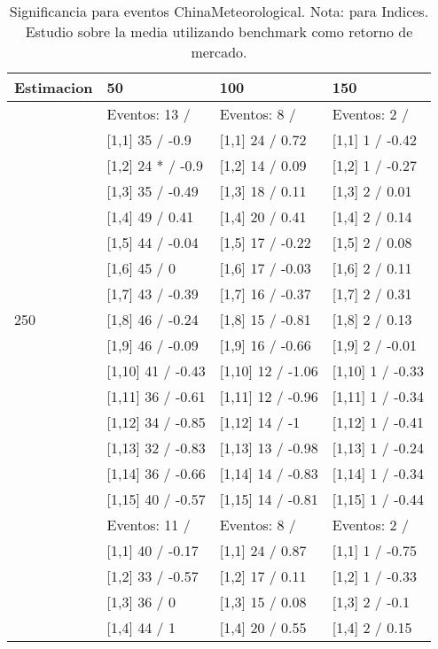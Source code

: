 \begin{table}

\caption{Significancia para eventos ChinaMeteorological. Nota: para Indices. Estudio sobre la media utilizando benchmark como retorno de mercado.}
\centering
\begin{tabular}[t]{llll}
\toprule
Estimacion & 50 & 100 & 150\\
\midrule
 & Eventos:  13 / & Eventos:  8 / & Eventos:  2 /\\
 & {}[1,1] 35  / -0.9 & {}[1,1] 24  / 0.72 & {}[1,1] 1  / -0.42\\
 & {}[1,2] 24 * / -0.9 & {}[1,2] 14  / 0.09 & {}[1,2] 1  / -0.27\\
 & {}[1,3] 35  / -0.49 & {}[1,3] 18  / 0.11 & {}[1,3] 2  / 0.01\\
 & {}[1,4] 49  / 0.41 & {}[1,4] 20  / 0.41 & {}[1,4] 2  / 0.14\\
\addlinespace
 & {}[1,5] 44  / -0.04 & {}[1,5] 17  / -0.22 & {}[1,5] 2  / 0.08\\
 & {}[1,6] 45  / 0 & {}[1,6] 17  / -0.03 & {}[1,6] 2  / 0.11\\
 & {}[1,7] 43  / -0.39 & {}[1,7] 16  / -0.37 & {}[1,7] 2  / 0.31\\
250 & {}[1,8] 46  / -0.24 & {}[1,8] 15  / -0.81 & {}[1,8] 2  / 0.13\\
 & {}[1,9] 46  / -0.09 & {}[1,9] 16  / -0.66 & {}[1,9] 2  / -0.01\\
\addlinespace
 & {}[1,10] 41  / -0.43 & {}[1,10] 12  / -1.06 & {}[1,10] 1  / -0.33\\
 & {}[1,11] 36  / -0.61 & {}[1,11] 12  / -0.96 & {}[1,11] 1  / -0.34\\
 & {}[1,12] 34  / -0.85 & {}[1,12] 14  / -1 & {}[1,12] 1  / -0.41\\
 & {}[1,13] 32  / -0.83 & {}[1,13] 13  / -0.98 & {}[1,13] 1  / -0.24\\
 & {}[1,14] 36  / -0.66 & {}[1,14] 14  / -0.83 & {}[1,14] 1  / -0.34\\
\addlinespace
 & {}[1,15] 40  / -0.57 & {}[1,15] 14  / -0.81 & {}[1,15] 1  / -0.44\\
 & Eventos:  11 / & Eventos:  8 / & Eventos:  2 /\\
 & {}[1,1] 40  / -0.17 & {}[1,1] 24  / 0.87 & {}[1,1] 1  / -0.75\\
 & {}[1,2] 33  / -0.57 & {}[1,2] 17  / 0.11 & {}[1,2] 1  / -0.33\\
 & {}[1,3] 36  / 0 & {}[1,3] 15  / 0.08 & {}[1,3] 2  / -0.1\\
\addlinespace
 & {}[1,4] 44  / 1 & {}[1,4] 20  / 0.55 & {}[1,4] 2  / 0.15\\

\end{tabular}
\end{table}
